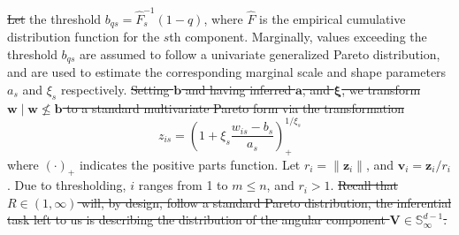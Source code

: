 \st{Let}  the threshold $b_{qs} = \hat{F}_{s}^{-1}(1 - q)$, where $\hat{F}$ is
    the empirical cumulative distribution function for the $s$th component.
    Marginally, values exceeding the threshold $b_{qs}$ are assumed to follow
    a univariate generalized Pareto distribution, and are used to estimate the
    corresponding marginal scale and shape parameters $a_{s}$ and $\xi_{s}$
    respectively.  \st{Setting $\bm{b}$ and having inferred $\bm{a}$, and $\bm{\xi}$, 
    we transform $\bm{w}\mid \bm{w}\not\leq \bm{b}$ to a standard multivariate 
    Pareto form via the transformation} 
    \begin{equation}
        \label{eqn:standardization}
        z_{is} = \left(1 + \xi_{s}\frac{w_{is} 
            - b_{s}}{a_{s}}\right)_{+}^{1 / \xi_{s}}
    \end{equation}
    where $(\cdot)_+$ indicates the positive parts function.  Let 
    $r_i = \lVert \bm{z}_i\rVert$, and $\bm{v}_i = \bm{z}_i / r_i$.  Due to 
    thresholding, $i$ ranges from 1 to $m\leq n$, and $r_i > 1$.  \st{Recall that
    $R\in (1, \infty)$ will, by design, follow a standard Pareto distribution,
    the inferential task left to us is describing the distribution of the
    angular component $\bm{V}\in\mathbb{S}_{\infty}^{d-1}$.  } 

